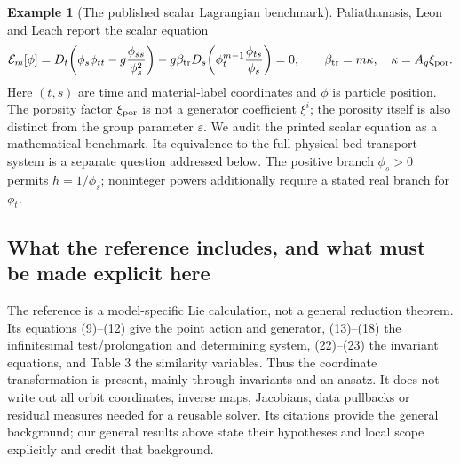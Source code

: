 \documentclass[11pt]{article}
\theoremstyle{definition}
\newtheorem{example}{Example}[section]
\newcommand{\E}{\mathcal E}
\begin{document}
\begin{example}[The published scalar Lagrangian benchmark]
\label{ex:sve}
Paliathanasis, Leon and Leach \cite{ap} report the scalar equation
\begin{equation}
 \E_m[\phi]=D_t\!\left(\phi_s\phi_{tt}
                       -g\frac{\phi_{ss}}{\phi_s^2}\right)
 -g\beta_{\rm tr}D_s\!\left(\phi_t^{m-1}
                                 \frac{\phi_{ts}}{\phi_s}\right)=0,
 \qquad \beta_{\rm tr}=m\kappa,\quad \kappa=A_g\xi_{\rm por}.
 \label{eq:sve}
\end{equation}
Here $(t,s)$ are time and material-label coordinates and $\phi$ is particle
position. The porosity factor $\xi_{\rm por}$ is not a generator coefficient
$\xi^i$; the porosity itself is also distinct from the group parameter
$\varepsilon$. We audit the printed scalar equation as a mathematical
benchmark. Its equivalence to the full physical bed-transport system is a
separate question addressed below. The positive branch $\phi_s>0$ permits
$h=1/\phi_s$; noninteger powers additionally require a stated real branch
for $\phi_t$.
\end{example}

\subsection{What the reference includes, and what must be made explicit here}
The reference is a model-specific Lie calculation, not a general reduction
theorem. Its equations (9)--(12) give the point action and generator,
(13)--(18) the infinitesimal test/prolongation and determining system,
(22)--(23) the invariant equations, and Table 3 the similarity variables.
Thus the coordinate transformation is present, mainly through invariants
and an ansatz. It does not write out all orbit coordinates, inverse maps,
Jacobians, data pullbacks or residual measures needed for a reusable solver.
Its citations provide the general background; our general results above
state their hypotheses and local scope explicitly and credit that background.
\end{document}
